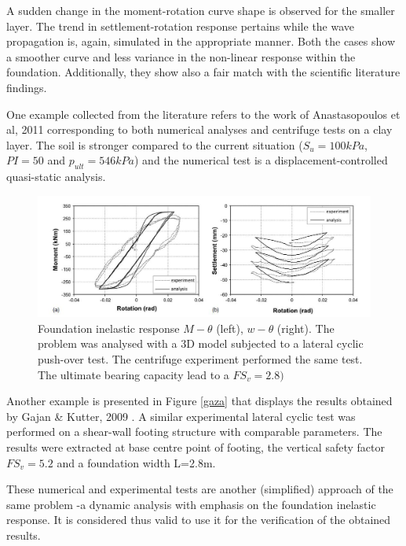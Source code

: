 A sudden change in the moment-rotation curve shape is observed for the smaller layer. The trend in settlement-rotation response pertains while the wave propagation is, again, simulated in the appropriate manner. Both the cases show a smoother curve and less variance in the non-linear response within the foundation. Additionally, they show also a fair match with the scientific literature findings.

One example collected from the literature refers to the work of Anastasopoulos et al, 2011 \cite{anastasopoulos2011simplified} corresponding to both numerical analyses and centrifuge tests on a clay layer. The soil is stronger compared to the current situation ($S_u=100kPa$, $PI=50$ and $p_{ult}=546kPa$)  and the numerical test is a displacement-controlled quasi-static analysis. 

\begin{figure}[!h]
	\centering
	\includegraphics[width=0.8 \linewidth]{"example4"}
	\caption{Foundation inelastic response $M-\theta$ (left), $w-\theta$ (right). The problem was analysed with a 3D model subjected to a lateral cyclic push-over test.  The centrifuge experiment performed the same test. The ultimate bearing capacity lead to a  $FS_v=2.8)$}
	\label{gazii}
\end{figure}

Another example is presented in Figure \ref{gaza} that displays the results obtained by Gajan \& Kutter, 2009 \cite{gajan2009effects}. A similar experimental lateral cyclic test was performed on a shear-wall footing structure with comparable parameters. The results were extracted at base centre point of footing, the vertical safety factor $FS_v=5.2$ and a foundation width L=2.8m.

These numerical and experimental tests are another (simplified) approach of the same problem -a dynamic analysis with emphasis on the foundation inelastic response. It is considered thus valid to use it for the verification of the obtained results.
 
